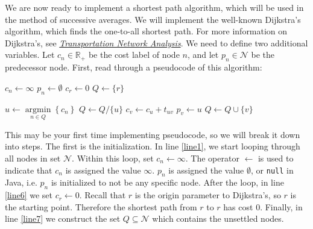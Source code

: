 \documentclass[11pt]{article}
\newcommand{\N}{\mathcal{N}}
\newcommand{\A}{\mathcal{A}}
\DeclareMathOperator*{\argmin}{\arg\min}
\begin{document}
We are now ready to implement a shortest path algorithm, which will be used in the method of successive averages. We will implement the well-known Dijkstra's algorithm, which finds the one-to-all shortest path. For more information on Dijkstra's, see \href{https://sboyles.github.io/blubook.html}{\textit{Transportation Network Analysis}}. We need to define two additional variables. Let $c_n\in\mathbb{R}_+$ be the cost label of node $n$, and let $p_n\in\N$ be the predecessor node. First, read through a pseudocode of this algorithm:


\vspace{\baselineskip}


\begin{algorithmic}[1]
	\For{$n\in \N$}  \label{line1}
	\State $c_n \leftarrow \infty$
	\State $p_n \leftarrow \emptyset$
	\EndFor
	\State $c_r \leftarrow 0$ \label{line6}
	\State  $Q\leftarrow \{r\}$ \label{line7}
	
	\vspace{0.5\baselineskip}
	
	  \label{line8}
	\State $u\leftarrow \argmin\limits_{n\in Q} \left\{ c_n\right\}$ \label{line9}
	\State $Q\leftarrow Q/\{u\}$
	\For{$(u,v)\in\A$} \label{line10}
	  \label{line11}
	\State $c_v \leftarrow c_u + t_{uv}$  \label{line12}
	\State $p_v \leftarrow u$
	\State $Q\leftarrow Q\cup \{v\}$ \label{line14}
	\EndIf
	\EndFor
	\EndWhile \label{line17}
	\EndProcedure 
	
\end{algorithmic}

\vspace{\baselineskip}

\noindent This may be your first time implementing pseudocode, so we will break it down into steps. The first is the initialization. In line \ref{line1}, we start looping through all nodes in set $\N$. Within this loop, set $c_n \leftarrow \infty$. The operator $\leftarrow$ is used to indicate that $c_n$ is assigned the value $\infty$. $p_n$ is assigned the value $\emptyset$, or \texttt{null} in Java, i.e. $p_n$ is initialized to not be any specific node. After the loop, in line \ref{line6} we set $c_r\leftarrow 0$. Recall that $r$ is the origin parameter to Dijkstra's, so $r$ is the starting point. Therefore the shortest path from $r$ to $r$ has cost $0$. Finally, in line \ref{line7} we construct the set $Q\subseteq\N$ which contains the unsettled nodes. 
\end{document}
